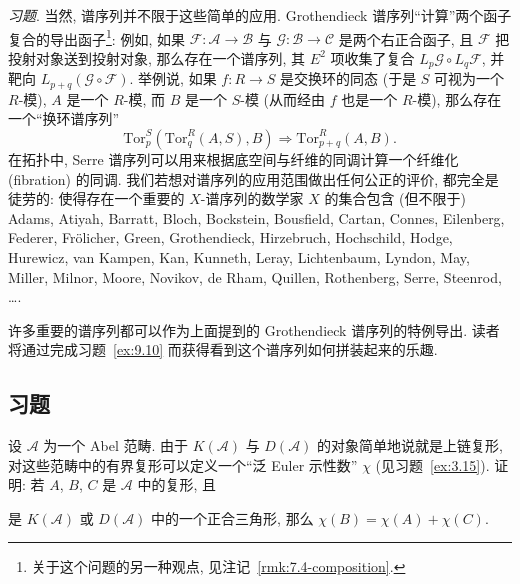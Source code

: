 \medskip
\noindent\emph{习题}. 当然, 谱序列并不限于这些简单的应用. Grothendieck 谱序列“计算”两个函子复合的导出函子\footnote{关于这个问题的另一种观点, 见注记~\ref{rmk:7.4-composition}.}: 例如, 如果 $\mathcal{F}:\mathcal{A}\to\mathcal{B}$ 与 $\mathcal{G}:\mathcal{B}\to\mathcal{C}$ 是两个右正合函子, 且 $\mathcal{F}$ 把投射对象送到投射对象, 那么存在一个谱序列, 其 $E^2$ 项收集了复合 $L_p\mathcal{G}\circ L_q\mathcal{F}$, 并靶向 $L_{p+q}(\mathcal{G}\circ\mathcal{F})$. 举例说, 如果 $f:R\to S$ 是交换环的同态 (于是 $S$ 可视为一个 $R$-模), $A$ 是一个 $R$-模, 而 $B$ 是一个 $S$-模 (从而经由 $f$ 也是一个 $R$-模), 那么存在一个“换环谱序列”
\[
\mathrm{Tor}^S_p(\mathrm{Tor}^R_q(A,S),B) \Rightarrow \mathrm{Tor}^R_{p+q}(A,B).
\]
在拓扑中, Serre 谱序列可以用来根据底空间与纤维的同调计算一个纤维化 (fibration) 的同调. 我们若想对谱序列的应用范围做出任何公正的评价, 都完全是徒劳的: 使得存在一个重要的 $X$-谱序列的数学家 $X$ 的集合包含 (但不限于) Adams, Atiyah, Barratt, Bloch, Bockstein, Bousfield, Cartan, Connes, Eilenberg, Federer, Fr\"olicher, Green, Grothendieck, Hirzebruch, Hochschild, Hodge, Hurewicz, van Kampen, Kan, Kunneth, Leray, Lichtenbaum, Lyndon, May, Miller, Milnor, Moore, Novikov, de Rham, Quillen, Rothenberg, Serre, Steenrod, \dots.

许多重要的谱序列都可以作为上面提到的 Grothendieck 谱序列的特例导出. 读者将通过完成习题~\ref{ex:9.10} 而获得看到这个谱序列如何拼装起来的乐趣.

\subsection*{习题}
{}

\begin{prob}\label{ex:9.1}
设 $\mathcal{A}$ 为一个 Abel 范畴. 由于 $K(\mathcal{A})$ 与 $D(\mathcal{A})$ 的对象简单地说就是上链复形, 对这些范畴中的有界复形可以定义一个“泛 Euler 示性数” $\chi$ (见习题~\ref{ex:3.15}). 证明: 若 $A$, $B$, $C$ 是 $\mathcal{A}$ 中的复形, 且
\begin{center}
\end{center}
是 $K(\mathcal{A})$ 或 $D(\mathcal{A})$ 中的一个正合三角形, 那么 $\chi(B)=\chi(A)+\chi(C)$.
\end{prob}

